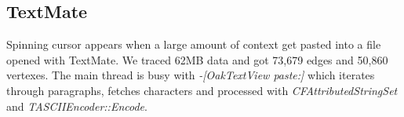 \subsection{TextMate}
Spinning cursor appears when a large amount of context get pasted into a file
opened with TextMate.  We traced 62MB data and got 73,679 edges and 50,860
vertexes.  The main thread is busy with \textit{-[OakTextView paste:]} which
iterates through paragraphs, fetches characters and processed with
\textit{CFAttributedStringSet} and \textit{TASCIIEncoder::Encode}.
